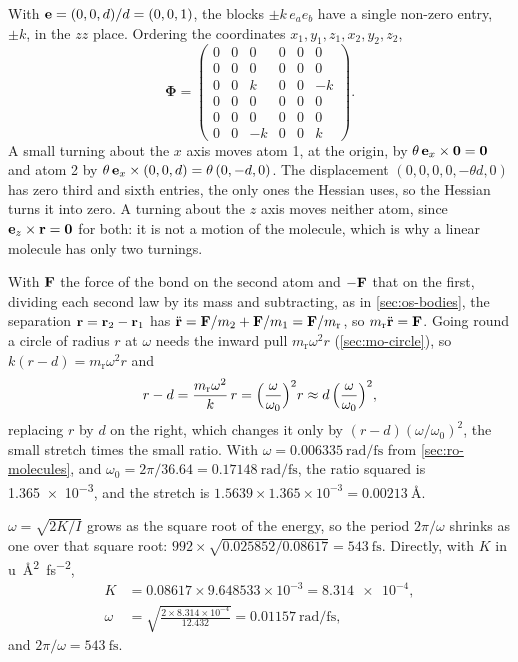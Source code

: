 With $\bm{\mathrm{e}} = (0, 0, d)/d = (0, 0, 1)$, the blocks
$\pm k\,e_ae_b$ have a single non-zero entry, $\pm k$, in the $zz$ place.
Ordering the coordinates $x_1, y_1, z_1, x_2, y_2, z_2$,
\begin{equation*}
   \boldsymbol{\Phi} = \begin{pmatrix}
      0 & 0 & 0 & 0 & 0 & 0\\
      0 & 0 & 0 & 0 & 0 & 0\\
      0 & 0 & k & 0 & 0 & -k\\
      0 & 0 & 0 & 0 & 0 & 0\\
      0 & 0 & 0 & 0 & 0 & 0\\
      0 & 0 & -k & 0 & 0 & k
   \end{pmatrix} .
\end{equation*}
A small turning about the $x$ axis moves atom 1, at the origin,
by $\theta\,\bm{\mathrm{e}}_x\times\bm{\mathrm{0}} = \bm{\mathrm{0}}$ and atom 2 by
$\theta\,\bm{\mathrm{e}}_x\times(0, 0, d) = \theta\,(0, -d, 0)$. The
displacement $(0, 0, 0, 0, -\theta d, 0)$ has zero third and sixth
entries, the only ones the Hessian uses, so the Hessian turns it into zero.
A turning about the $z$ axis moves neither atom, since $\bm{\mathrm{e}}_z\times\bm{\mathrm{r}}
= \bm{\mathrm{0}}$ for both: it is not a motion of the molecule, which is why a
linear molecule has only two turnings.

With $\bm{\mathrm{F}}$ the force of the bond on the
second atom and $-\bm{\mathrm{F}}$ that on the first, dividing each second law by
its mass and subtracting, as in \cref{sec:os-bodies}, the separation
$\bm{\mathrm{r}} = \bm{\mathrm{r}}_2 - \bm{\mathrm{r}}_1$ has $\ddot{\bm{\mathrm{r}}} = \bm{\mathrm{F}}/m_2 + \bm{\mathrm{F}}/m_1
= \bm{\mathrm{F}}/m_{\mathrm r}$, so $m_{\mathrm r}\ddot{\bm{\mathrm{r}}} = \bm{\mathrm{F}}$. Going round a
circle of radius $r$ at $\omega$ needs the inward pull $m_{\mathrm
r}\omega^2r$ (\cref{sec:mo-circle}), so $k(r - d) = m_{\mathrm r}
\omega^2r$ and
\begin{equation*}
   r - d = \frac{m_{\mathrm r}\omega^2}{k}\,r
   = \Bigl(\frac{\omega}{\omega_0}\Bigr)^2 r
   \approx d\,\Bigl(\frac{\omega}{\omega_0}\Bigr)^2 ,
\end{equation*}
replacing $r$ by $d$ on the right, which changes it only by $(r -
d)(\omega/\omega_0)^2$, the small stretch times the small
ratio. With $\omega = \SI{0.006335}{\radian\per\femto
\second}$ from \cref{sec:ro-molecules}, and
$\omega_0 = 2\pi/36.64 = \SI{0.17148}{\radian\per\femto\second}$,
the ratio squared is \num{1.365e-3}, and the stretch is
$1.5639\times1.365\times10^{-3} = \SI{0.00213}{\angstrom}$.

$\omega = \sqrt{2K/I}$ grows as the square root of
the energy, so the period $2\pi/\omega$ shrinks as one over that square
root:
$992\times\sqrt{0.025852/0.08617} = \SI{543}{\femto\second}$. Directly,
with $K$ in \si{\amu\angstrom\squared\per\femto\second\squared},
\begin{align*}
   K &= 0.08617\times9.648533\times10^{-3} = \num{8.314e-4} ,\\
   \omega &= \sqrt{\frac{2\times8.314\times10^{-4}}{12.432}}
   = \SI{0.01157}{\radian\per\femto\second} ,
\end{align*}
and $2\pi/\omega = \SI{543}{\femto\second}$.
